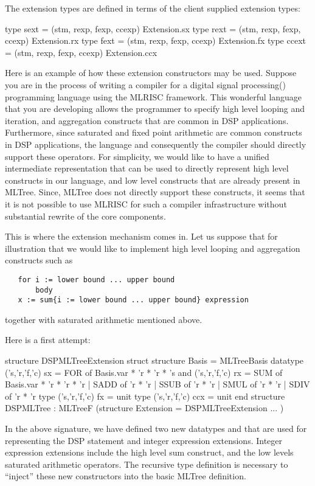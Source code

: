The extension types  are defined in terms
of the client supplied extension types: 
\begin{SML}
   type sext = (stm, rexp, fexp, ccexp) Extension.sx
   type rext = (stm, rexp, fexp, ccexp) Extension.rx
   type fext = (stm, rexp, fexp, ccexp) Extension.fx
   type ccext = (stm, rexp, fexp, ccexp) Extension.ccx
\end{SML}

Here is an example of how these extension constructors may be used.
Suppose you are in the process of writing a compiler for a 
digital signal processing() programming
language using the MLRISC framework.  This wonderful language that you
are developing allows the programmer to specify high level looping and
iteration, and aggregation constructs that are common in DSP applications.
Furthermore, since saturated and fixed point arithmetic are common constructs
in DSP applications, the language and consequently the compiler should directly 
support these operators.   For simplicity, we would
like to have a unified intermediate representation that can be used to directly 
represent high level constructs in our language, and low level constructs
that are already present in MLTree.  
Since, MLTree does not directly support these
constructs, it seems that it is not possible to use MLRISC for such a
compiler infrastructure without substantial rewrite of the core components.

This is where the extension mechanism comes in.  
Let us suppose that for illustration that we would like to
implement high level looping and aggregation constructs such as
\begin{verbatim}
   for i := lower bound ... upper bound
       body
   x := sum{i := lower bound ... upper bound} expression
\end{verbatim}
together with saturated arithmetic mentioned above.

Here is a first attempt:
\begin{SML}
structure DSPMLTreeExtension
struct
   structure Basis = MLTreeBasis
   datatype ('s,'r,'f,'c) sx = 
      FOR of Basis.var * 'r * 'r * 's
   and ('s,'r,'f,'c) rx = 
      SUM of Basis.var * 'r * 'r * 'r
    | SADD of 'r * 'r
    | SSUB of 'r * 'r
    | SMUL of 'r * 'r
    | SDIV of 'r * 'r
   type ('s,'r,'f,'c) fx = unit
   type ('s,'r,'f,'c) ccx = unit
end
structure DSPMLTree : MLTreeF
    (structure Extension = DSPMLTreeExtension
     ...
    )
\end{SML}
In the above signature, we have defined two new datatypes 
and  that are used for representing the DSP statement
and integer expression extensions.  Integer expression extensions
include the high level sum construct, and the low levels saturated
arithmetic operators.  The recursive type definition is
necessary to ``inject'' these new constructors into the basic MLTree 
definition.

